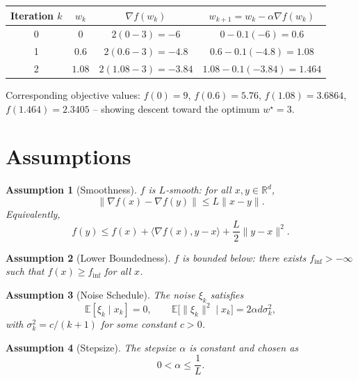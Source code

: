 \documentclass{article}
\newtheorem{assumption}{Assumption}
\begin{document}
\begin{center}
\begin{tabular}{c|c|c|c}
Iteration $k$ & $w_{k}$ & $\nabla f(w_{k})$ & $w_{k+1}=w_{k}-\alpha\nabla f(w_{k})$\\\hline
0 & $0$ & $2(0-3)=-6$ & $0-0.1(-6)=0.6$\\
1 & $0.6$ & $2(0.6-3)=-4.8$ & $0.6-0.1(-4.8)=1.08$\\
2 & $1.08$ & $2(1.08-3)=-3.84$ & $1.08-0.1(-3.84)=1.464$\\
\end{tabular}
\end{center}

Corresponding objective values: $f(0)=9$, $f(0.6)=5.76$, $f(1.08)=3.6864$, $f(1.464)=2.3405$ – showing descent toward the optimum $w^{\star}=3$.

\newpage
\section*{Assumptions}
\begin{assumption}[Smoothness]\label{as:smooth}
$f$ is $L$‑smooth: for all $x,y\in\mathbb{R}^{d}$,
\[
\|\nabla f(x)-\nabla f(y)\| \le L\|x-y\| .
\tag{A1}
\]
Equivalently,
\[
f(y)\le f(x)+\langle \nabla f(x),y-x\rangle+\frac{L}{2}\|y-x\|^{2}.
\tag{A1'}
\]
\end{assumption}

\begin{assumption}[Lower Boundedness]\label{as:lb}
$f$ is bounded below: there exists $f_{\inf}>-\infty$ such that $f(x)\ge f_{\inf}$ for all $x$.
\end{assumption}

\begin{assumption}[Noise Schedule]\label{as:noise}
The noise $\xi_{k}$ satisfies  
\[
\mathbb{E}[\xi_{k}\mid x_{k}]=0,\qquad 
\mathbb{E}\bigl[\|\xi_{k}\|^{2}\mid x_{k}\bigr]=2\alpha d\sigma_{k}^{2},
\tag{A3}
\]
with $\sigma_{k}^{2}=c/(k+1)$ for some constant $c>0$.
\end{assumption}

\begin{assumption}[Stepsize]\label{as:stepsize}
The stepsize $\alpha$ is constant and chosen as  
\[
0<\alpha\le \frac{1}{L}.
\tag{A4}
\]
\end{assumption}
\end{document}
